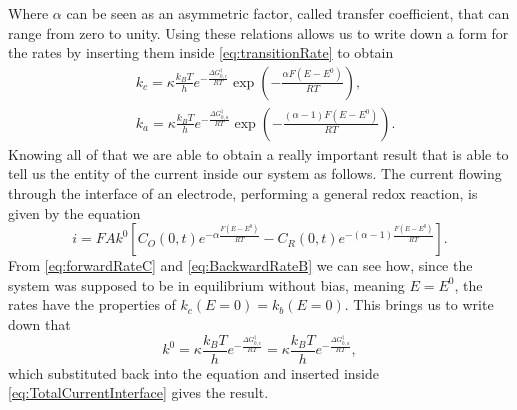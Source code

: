 Where $\alpha$ can be seen as an asymmetric factor, called transfer coefficient, that can range from zero to unity. Using these relations allows us to write down a form for the rates by inserting them inside \eqref{eq:transitionRate} to obtain
\begin{align}
    \label{eq:forwardRateC}
    &k_c = \kappa\frac{k_BT}{h}e^{-\frac{\Delta G^\ddagger_{0,c}}{RT}}\exp\left( -\frac{\alpha F(E-E^0)}{RT} \right), \\
    \label{eq:BackwardRateB}
    &k_a = \kappa\frac{k_BT}{h}e^{-\frac{\Delta G^\ddagger_{0,a}}{RT}}\exp\left( -\frac{(\alpha -1)F(E-E^0)}{RT} \right).
\end{align}
Knowing all of that we are able to obtain a really important result that is able to tell us the entity of the current inside our system as follows.
{
    The current flowing through the interface of an electrode, performing a general redox reaction, is given by the equation
    \begin{equation}
        i = FAk^0\left[ C_O(0,t)e^{-\alpha\frac{F(E - E^0)}{RT}} - C_R(0,t)e^{-(\alpha - 1)\frac{F(E-E^0)}{RT}} \right].
    \end{equation}
}
{
    From \eqref{eq:forwardRateC} and \eqref{eq:BackwardRateB} we can see how, since the system was supposed to be in equilibrium without bias, meaning $E=E^0$, the rates have the properties of $k_c(E=0) = k_b(E=0)$. This brings us to write down that
    \begin{equation}
        k^0 = \kappa\frac{k_BT}{h}e^{-\frac{\Delta G^\ddagger_{0,c}}{RT}} = \kappa\frac{k_BT}{h}e^{-\frac{\Delta G^\ddagger_{0,a}}{RT}},
    \end{equation}
    which substituted back into the equation and inserted inside \eqref{eq:TotalCurrentInterface} gives the result.
}